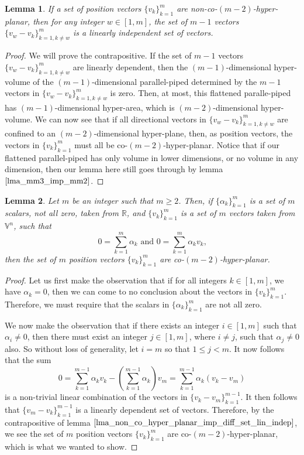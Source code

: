 \documentclass[12pt]{article}
\newcommand{\V}{\mathbb{V}}
\newcommand{\R}{\mathbb{R}}
\newtheorem{lemma}{Lemma}[section]
\begin{document}
\begin{lemma}\label{lma_non_co_hyper_planar_imp_diff_set_lin_indep}
If a set of position vectors $\{v_k\}_{k=1}^m$ are non-co-$(m-2)$-hyper-planar,
then for any integer $w\in[1,m]$, the set of $m-1$ vectors $\{v_w-v_k\}_{k=1,k\neq w}^m$
is a linearly independent set of vectors.
\end{lemma}
\begin{proof}
We will prove the contrapositive.  If the set of $m-1$ vectors $\{v_w-v_k\}_{k=1,k\neq w}^m$
are linearly dependent, then the $(m-1)$-dimensional hyper-volume of the $(m-1)$-dimensional
parallel-piped determined by the $m-1$ vectors in $\{v_w-v_k\}_{k=1,k\neq w}^m$ is zero.
Then, at most, this flattened paralle-piped has $(m-1)$-dimensional hyper-area, which is
$(m-2)$-dimensional hyper-volume.  We can now see that if all directional vectors in
$\{v_w-v_k\}_{k=1,k\neq w}^m$ are confined to an $(m-2)$-dimensional hyper-plane, then,
as position vectors, the vectors in $\{v_k\}_{k=1}^m$ must all be co-$(m-2)$-hyper-planar.
Notice that if our flattened
parallel-piped has only volume in lower dimensions, or no volume in any dimension,
then our lemma here still goes through by lemma $\eqref{lma_mm3_imp_mm2}$.
\end{proof}

\begin{lemma}\label{lma_lin_combo_hyper_planar}
Let $m$ be an integer such that $m\geq 2$.
Then, if $\{\alpha_k\}_{k=1}^m$ is a set of $m$ scalars, not all zero, taken from $\R$,
and $\{v_k\}_{k=1}^m$ is a set of $m$ vectors taken from $\V^n$, such that
\begin{equation*}
\mbox{$0=\sum_{k=1}^m\alpha_k$ and $0=\sum_{k=1}^m\alpha_k v_k$,}
\end{equation*}
then the set of $m$ position vectors $\{v_k\}_{k=1}^m$ are co-$(m-2)$-hyper-planar.
\end{lemma}
\begin{proof}
Let us first make the observation that if for all integers $k\in[1,m]$, we have
$\alpha_k=0$, then we can come to no conclusion about the vectors in $\{v_k\}_{k=1}^m$.
Therefore, we must require that the scalars in $\{\alpha_k\}_{k=1}^m$ are not
all zero.

We now make the observation that if there exists an integer $i\in[1,m]$ such that
$\alpha_i\neq 0$, then there must exist an integer $j\in[1,m]$, where $i\neq j$, such
that $\alpha_j\neq 0$ also.
So without loss of generality, let $i=m$ so that $1\leq j<m$.
It now follows that the sum
\begin{equation*}
0 = \sum_{k=1}^{m-1}\alpha_k v_k - \left(\sum_{k=1}^{m-1}\alpha_k\right)v_m
 = \sum_{k=1}^{m-1}\alpha_k(v_k-v_m)
\end{equation*}
is a non-trivial linear combination of the vectors in $\{v_k-v_m\}_{k=1}^{m-1}$.
It then follows that $\{v_m-v_k\}_{k=1}^{m-1}$ is a linearly dependent set of vectors.
Therefore, by the contrapositive of lemma $\eqref{lma_non_co_hyper_planar_imp_diff_set_lin_indep}$,
we see the set of $m$ position vectors $\{v_k\}_{k=1}^m$ are co-$(m-2)$-hyper-planar,
which is what we wanted to show.
\end{proof}
\end{document}
